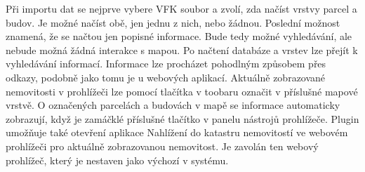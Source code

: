 \documentclass[a4paper,10pt]{article}
\begin{document}
Při importu dat se nejprve vybere VFK soubor a zvolí, zda načíst vrstvy parcel a budov.
Je možné načíst obě, jen jednu z nich, nebo žádnou.
Poslední možnost znamená, že se načtou jen popisné informace.
Bude tedy možné vyhledávání, ale nebude možná žádná interakce s mapou.
Po načtení databáze a vrstev lze přejít k vyhledávání informací.
Informace lze procházet pohodlným způsobem přes odkazy, podobně jako tomu je u webových aplikací.
Aktuálně zobrazované nemovitosti v prohlížeči lze pomocí tlačítka v toobaru označit v příslušné mapové vrstvě.
O označených parcelách a budovách v mapě se informace automaticky zobrazují, když je zamáčklé příslušné tlačítko v panelu nástrojů prohlížeče.
Plugin umožňuje také otevření aplikace Nahlížení do katastru nemovitostí ve webovém prohlížeči pro aktuálně zobrazovanou nemovitost.
Je zavolán ten webový prohlížeč, který je nestaven jako výchozí v systému.
\end{document}
